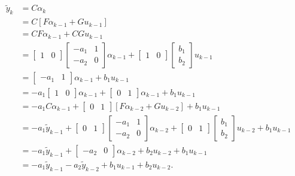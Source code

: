\begin{align}
	\tilde{y}_k &= C\alpha_k \nonumber\\
	&= C[F \alpha_{k-1} + G u_{k-1}] \nonumber\\
	&= CF \alpha_{k-1} + CG u_{k-1} \nonumber\\
	&= \begin{bmatrix}1 & 0\end{bmatrix}\begin{bmatrix}-a_1 & 1\\-a_2 & 0\end{bmatrix}\alpha_{k-1} + \begin{bmatrix}1 & 0\end{bmatrix}\begin{bmatrix}b_1\\b_2\end{bmatrix} u_{k-1} \nonumber\\
	&= \begin{bmatrix}-a_1 & 1\end{bmatrix}\alpha_{k-1} + b_1 u_{k-1} \nonumber\\
	&= -a_1\begin{bmatrix}1 & 0\end{bmatrix}\alpha_{k-1} + \begin{bmatrix}0 & 1\end{bmatrix}\alpha_{k-1} + b_1 u_{k-1} \nonumber\\
	&= -a_1 C \alpha_{k-1} + \begin{bmatrix}0 & 1\end{bmatrix}[F \alpha_{k-2} + G u_{k-2}] + b_1 u_{k-1} \nonumber\\
	&= -a_1 \tilde{y}_{k-1} + \begin{bmatrix}0 & 1\end{bmatrix}\begin{bmatrix}-a_1 & 1\\-a_2 & 0\end{bmatrix}\alpha_{k-2} + \begin{bmatrix}0 & 1\end{bmatrix}\begin{bmatrix}b_1\\b_2\end{bmatrix}u_{k-2} +b_1 u_{k-1}\nonumber\\
	&= -a_1\tilde{y}_{k-1} + \begin{bmatrix}-a_2 & 0\end{bmatrix}\alpha_{k-2} + b_2 u_{k-2} + b_1 u_{k-1} \nonumber\\
	&= -a_1 \tilde{y}_{k-1} - a_2 \tilde{y}_{k-2} + b_1 u_{k-1} + b_2 u_{k-2}.
\end{align}
